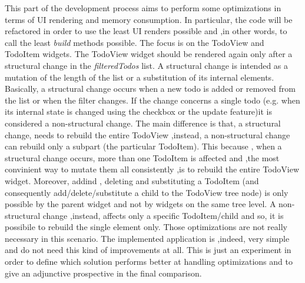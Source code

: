 
This part of the development process aims to perform some optimizations in terms of UI rendering and memory consumption. In particular, the code will be refactored in order to use the least UI renders possible and ,in other words, to call the least \textit{build} methods possible. The focus is on the TodoView and TodoItem widgets. The TodoView widget should be rendered again only after a structural change in the \textit{filteredTodos} list. A structural change is intended as a mutation of the length of the list or a substitution of its internal elements. Basically, a structural change occurs when a new todo is added or removed from the list or when the filter changes. If the change concerns a single todo (e.g. when its internal state is changed using the checkbox or the update feature)it is considered a non-structural change. The main difference is that, a structural change, needs to rebuild the entire TodoView ,instead, a non-structural change can rebuild only a subpart (the particular TodoItem). This because , when a structural change occurs, more than one TodoItem is affected and ,the most convinient way to mutate them all consistently ,is to rebuild the entire TodoView widget. Moreover, addind , deleting and substituting a TodoItem (and consequently add/delete/substitute a child to the TodoView tree node) is only possible by the parent widget and not by widgets on the same tree level. A non-structural change ,instead, affects only a specific TodoItem/child and so, it is possibile to rebuild the single element only. Those optimizations are not really necessary in this scenario. The implemented application is ,indeed, very simple and do not need this kind of improvements at all. This is just an experiment in order to define which solution performs better at handling optimizations and to give an adjunctive prospective in the final comparison.